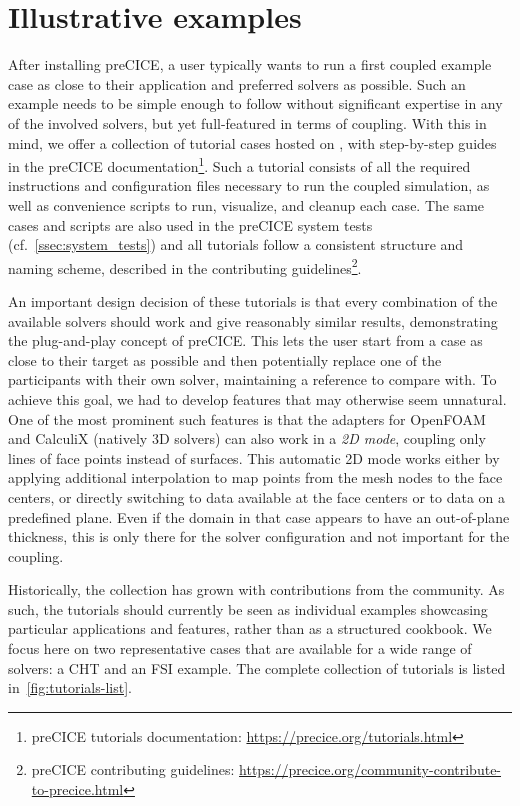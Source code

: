 \section{Illustrative examples}\label{sec:tutorials}

After installing preCICE, a user typically wants to run a first coupled example case as close to their application and preferred solvers as possible. Such an example needs to be simple enough to follow without significant expertise in any of the involved solvers, but yet full-featured in terms of coupling. With this in mind, we offer a collection of tutorial cases hosted on , with step-by-step guides in the preCICE documentation\footnote{preCICE tutorials documentation: \url{https://precice.org/tutorials.html}}. Such a tutorial consists of all the required instructions and configuration files necessary to run the coupled simulation, as well as convenience scripts to run, visualize, and cleanup each case. The same cases and scripts are also used in the preCICE system tests (cf.~\autoref{ssec:system_tests}) and all tutorials follow a consistent structure and naming scheme, described in the contributing guidelines\footnote{preCICE contributing guidelines: \url{https://precice.org/community-contribute-to-precice.html}}.

An important design decision of these tutorials is that every combination of the available solvers should work and give reasonably similar results,
demonstrating the plug-and-play concept of preCICE. This lets the user start from a case as close to their target as possible
and then potentially replace one of the participants with their own solver, maintaining a reference to compare with.
To achieve this goal, we had to develop features that may otherwise seem unnatural.
One of the most prominent such features is that the adapters for OpenFOAM and CalculiX (natively 3D solvers) can also work
in a \emph{2D mode}, coupling only lines of face points instead of surfaces. This automatic 2D mode works either by applying
additional interpolation to map points from the mesh nodes to the face centers, or directly switching to data available at the face centers
or to data on a predefined plane. Even if the domain in that case appears to have an out-of-plane thickness, this is only there
for the solver configuration and not important for the coupling.

Historically, the collection has grown with contributions from the community. As such, the tutorials should currently be seen as individual examples showcasing particular applications and features, rather than as a structured cookbook. We focus here on two representative cases that are available for a wide range of solvers: a CHT and an FSI example. The complete collection of tutorials is listed in~\autoref{fig:tutorials-list}.

